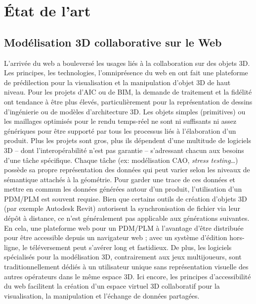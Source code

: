 \chapter{État de l'art}
\chaptertable


\section{Modélisation 3D collaborative sur le Web}

L'arrivée du web a bouleversé les usages liés à la collaboration sur des objets 3D. 
Les principes, les technologies, l'omniprésence du web en ont fait une plateforme 
de prédilection pour la visualisation et la manipulation d'objet 3D de haut niveau.   
Pour les projets d'\gls{AIC} ou de \gls{BIM}, la demande de traitement et la fidélité 
ont tendance à être plus élevés, particulièrement pour la représentation de dessins 
d'ingénierie ou de modèles d'architecture 3D. 
Les objets simples (primitives) ou les maillages optimisés pour le rendu temps-réel 
ne sont ni suffisants ni assez génériques pour être supporté par tous les 
processus liés à l'élaboration d'un produit. 
Plus les projets sont gros, plus ils dépendent d'une multitude de logiciels 3D --  
dont l'interopérabilité n'est pas garantie -- s'adressant chacun aux besoins d'une 
tâche spécifique. 
Chaque tâche (ex: modélisation \gls{CAO}, \textit{stress testing}\ldots) possède sa 
propre représentation des données qui peut varier selon les niveaux de 
sémantique attachés à la géométrie. 
Pour garder une trace de ces données et mettre en commun les données 
générées autour d'un produit, l'utilisation d'un \gls{PDM}/\gls{PLM} est 
souvent requise. Bien que certains outils de création d'objets 3D (par exemple 
Autodesk Revit) autorisent la synchronisation de fichier via leur dépôt à distance, 
ce n'est généralement pas applicable aux générations suivantes. 
En cela, une plateforme web pour un \gls{PDM}/\gls{PLM} à 
l'avantage d'être distribuée pour être accessible depuis un navigateur web ; avec 
un système d'édition hors-ligne, le téléversement peut s'avérer long et fastidieux.
De plus, les logiciels spécialisés pour la modélisation 3D, contrairement aux jeux 
multijoueurs, sont traditionnellement dédiés à un utilisateur unique sans 
représentation visuelle des autres opérateurs dans le même espace 3D. 
Ici encore, les principes d'accessibilité du web facilitent la création d'un espace 
virtuel 3D collaboratif pour la visualisation, la manipulation et l'échange de
données partagées. 
